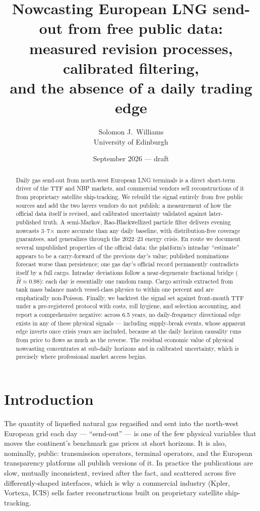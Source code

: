 \documentclass[11pt]{article}
\title{Nowcasting European LNG send-out from free public data:\\
measured revision processes, calibrated filtering,\\ and the absence of a daily trading edge}
\author{Solomon J.\ Williams\\ \small University of Edinburgh}
\date{September 2026 — draft}
\begin{document}
\maketitle

\begin{abstract}
Daily gas send-out from north-west European LNG terminals is a direct
short-term driver of the TTF and NBP markets, and commercial vendors sell
reconstructions of it from proprietary satellite ship-tracking. We rebuild
the signal entirely from free public sources and add the two layers vendors
do not publish: a measurement of how the official data itself is revised,
and calibrated uncertainty validated against later-published truth. A
semi-Markov, Rao-Blackwellized particle filter delivers evening nowcasts
3--7$\times$ more accurate than any daily baseline, with distribution-free
coverage guarantees, and generalizes through the 2022--23 energy crisis.
En route we document several unpublished properties of the official data:
the platform's intraday ``estimate'' appears to be a carry-forward of the
previous day's value; published nominations forecast worse than
persistence; one gas day's official record permanently contradicts itself
by a full cargo. Intraday deviations follow a near-degenerate fractional
bridge ($\hat H\approx0.98$): each day is essentially one random ramp.
Cargo arrivals extracted from tank mass balance match vessel-class physics
to within one percent and are emphatically non-Poisson. Finally, we
backtest the signal set against front-month TTF under a pre-registered
protocol with costs, roll hygiene, and selection accounting, and report a
comprehensive negative: across 6.5 years, no daily-frequency directional
edge exists in any of these physical signals --- including supply-break
events, whose apparent edge inverts once crisis years are included,
because at the daily horizon causality runs from price to flows as much as
the reverse. The residual economic value of physical nowcasting
concentrates at sub-daily horizons and in calibrated uncertainty, which is
precisely where professional market access begins.
\end{abstract}

\section{Introduction}
The quantity of liquefied natural gas regasified and sent into the
north-west European grid each day --- ``send-out'' --- is one of the few
physical variables that moves the continent's benchmark gas prices at
short horizons. It is also, nominally, public: transmission operators,
terminal operators, and the European transparency platforms all publish
versions of it. In practice the publications are slow, mutually
inconsistent, revised after the fact, and scattered across five
differently-shaped interfaces, which is why a commercial industry (Kpler,
Vortexa, ICIS) sells faster reconstructions built on proprietary satellite
ship-tracking.
\end{document}
